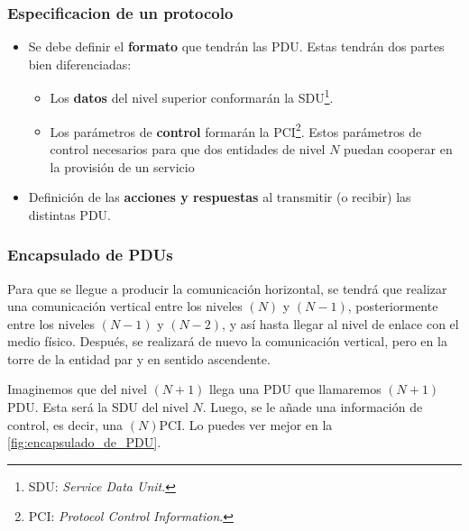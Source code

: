 \documentclass[a4paper]{book}
\numberwithin{figure}{chapter}
\numberwithin{equation}{subsection}
\begin{document}
\subsubsection{Especificacion de un protocolo}
\vspace{1.5\parskip}
\begin{itemize}
  \item Se debe definir el \textbf{formato} que tendrán las PDU. Estas tendrán dos partes bien diferenciadas:
        \begin{itemize}
          \item Los \textbf{datos} del nivel superior conformarán la SDU\footnote{SDU: \textsl{Service Data Unit}.}.
          \item Los parámetros de \textbf{control} formarán la PCI\footnote{PCI: \textsl{Protocol Control Information}.}. Estos parámetros de control necesarios para que dos entidades de nivel $N$ puedan cooperar en la provisión de un servicio
        \end{itemize}
  \item Definición de las \textbf{acciones y respuestas} al transmitir (o recibir) las distintas PDU.
\end{itemize}

\subsubsection{Encapsulado de PDUs}
Para que se llegue a producir la comunicación horizontal, se tendrá que realizar una comunicación vertical entre los niveles $(N)$ y $(N-1)$, posteriormente entre los niveles $(N-1)$ y $(N-2)$, y así hasta llegar al nivel de enlace con el medio físico. Después, se realizará de nuevo la comunicación vertical, pero en la torre de la entidad par y en sentido ascendente.

Imaginemos que del nivel $(N+1)$ llega una PDU que llamaremos $(N+1)$PDU. Esta será la SDU del nivel $N$. Luego, se le añade una información de control, es decir, una $(N)$PCI. Lo puedes ver mejor en la \autoref{fig:encapsulado_de_PDU}.
\end{document}
